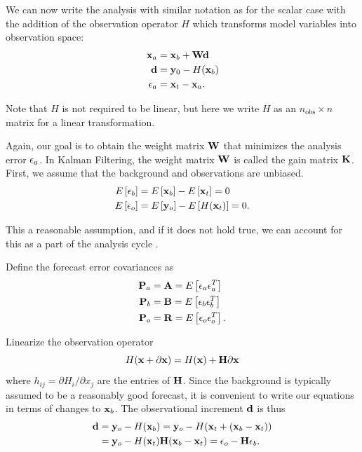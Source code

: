 We can now write the analysis with similar notation as for the scalar case with the addition of the observation operator $H$ which transforms model variables into observation space:
\begin{align} \mathbf{x}_a &= \mathbf{x}_b + \mathbf{W} \mathbf{d} \\
\mathbf{d} &=  \mathbf{y}_0 - H (\mathbf{x} _b ) \\
\mathbf{\epsilon} _a  &= \mathbf{x}_t - \mathbf{x}_a . \end{align}

Note that $H$ is not required to be linear, but here we write $H$ as an $n_{\text{obs}} \times n$ matrix for a linear transformation.

Again, our goal is to obtain the weight matrix $\mathbf{W}$ that minimizes the analysis error $\mathbf{\epsilon}_a$. In Kalman Filtering, the weight matrix $\mathbf{W}$ is called the gain matrix $\mathbf{K}$.
First, we assume that the background and observations are unbiased.
\begin{align*} E \left [  \mathbf{\epsilon}_b \right ] &= E \left [  \mathbf{x} _b \right ] - E \left [ \mathbf{x} _t  \right ] = 0\\
E \left [  \mathbf{\epsilon}_o  \right ]  &= E \left [  \mathbf{y}_o  \right ] - E \left [  H(\mathbf{x}_t) \right ] = 0 .\end{align*}

This a reasonable assumption, and if it does not hold true, we can account for this as a part of the analysis cycle .

Define the forecast error covariances as
\begin{align} \mathbf{P}_a &= \mathbf{A} = E \left [ \mathbf{\epsilon}_a \mathbf{\epsilon}_a ^T \right ]\\
\mathbf{P}_b &= \mathbf{B} = E \left [  \mathbf{\epsilon}_b \mathbf{\epsilon}_b ^T \right ]\\ 
\mathbf{P}_o &= \mathbf{R} = E \left [  \mathbf{\epsilon}_o \mathbf{\epsilon}_o ^T \right ] . \end{align}

Linearize the observation operator
\begin{equation} H(\mathbf{x} + \partial \mathbf{x} ) = H(\mathbf{x}) + \mathbf{H} \partial \mathbf{x} \end{equation}
where $h_{ij} = \partial H_i / \partial x_j$ are the entries of $\mathbf{H}$.
Since the background is typically assumed to be a reasonably good forecast, it is convenient to write our equations in terms of changes to $\mathbf{x} _b$.
The observational increment $\mathbf{d}$ is thus
\begin{align} \mathbf{d} &= \mathbf{y}_o - H(\mathbf{x}_b) = \mathbf{y}_o - H(\mathbf{x}_t + (\mathbf{x}_b-\mathbf{x}_t)) \\
&= \mathbf{y}_o - H(\mathbf{x} _t) \mathbf{H} (\mathbf{x}_b -\mathbf{x}_t) = \mathbf{\epsilon}_o - \mathbf{H} \mathbf{\epsilon}_b . \end{align} 

